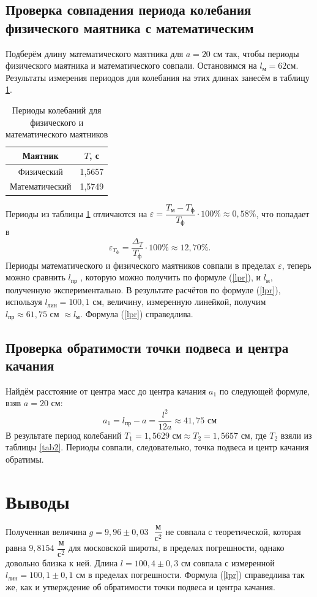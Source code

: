 \documentclass{article}
\begin{document}
\subsection*{Проверка совпадения периода колебания физического маятника с математическим}
Подберём длину математического маятника для \(a = 20 \text{ см}\) так, чтобы периоды физического маятника и математического совпали. Остановимся на \(l_{\text{м}}=62 см\). Результаты измерения периодов для колебания на этих длинах занесём в таблицу \ref{tab4}. 
\begin{table}[h!]
\centering
\begin{tabular}{|c|c|}
\hline
Маятник        & \(T\), с      \\ \hline
Физический     & 1,5657 \\
Математический & 1,5749 \\ \hline
\end{tabular}
\label{tab4}
\caption{Периоды колебаний для физического и математического маятников}
\end{table}
Периоды из таблицы \ref{tab4} отличаются на \(\varepsilon = \dfrac{T_{\text{м}}-T_{\text{ф}}}{T_{\text{ф}}} \cdot 100\% \approx 0,58 \%\), что попадает в \[\varepsilon_{T_{\text{ф}}}=\dfrac{\Delta_{T}}{T_{\text{ф}}}\cdot 100\% \approx 12,70\%.\] Периоды математического и физического маятников совпали в пределах \(\varepsilon\), теперь можно сравнить \(l_{\text{пр}}\) , которую можно получить по формуле (\ref{lpr}), и \(l_{\text{м}}\), полученную экспериментально.
В результате расчётов по формуле (\ref{lpr}), используя \(l_{\text{лин}} = 100,1 \text{ см}\), величину, измеренную линейкой, получим \(l_{\text{пр}} \approx 61,75 \text{ см } \approx l_{\text{м}}\). Формула (\ref{lpr}) справедлива.
\subsection*{Проверка обратимости точки подвеса и центра качания}
Найдём расстояние от центра масс до центра качания \(a_1\) по следующей формуле, взяв \(a = 20 \text{ см}\):
\[
a_1= l_{\text{пр}} - a = \frac{l^2}{12a} \approx 41,75 \text{ см}
\]
В результате период колебаний \(T_1 = 1,5629 \text{ см} \approx T_2 = 1,5657 \text{ см}\), где \(T_2\) взяли из таблицы \ref{tab2}. Периоды совпали, следовательно, точка подвеса и центр качания обратимы.
\section{Выводы}
Полученная величина \(g=9,96\pm0,03 \text{ } \dfrac{\text{м}}{\text{с}^2}\) не совпала с теоретической, которая равна \(9,8154\) \(\dfrac{\text{м}}{\text{с}^2}\) для московской широты, в пределах погрешности, однако довольно близка к ней. Длина \(l=100,4\pm0,3 \text{ см}\) совпала с измеренной \(l_{\text{лин}} = 100,1 \pm 0,1 \text{ см}\) в пределах погрешности. Формула (\ref{lpr}) справедлива так же, как и утверждение об обратимости точки подвеса и центра качания.
\end{document}
